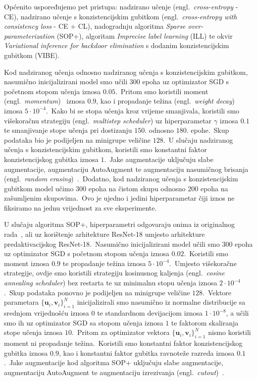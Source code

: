\documentclass[diplomskirad]{fer}
\begin{document}
Općenito uspoređujemo pet pristupa: nadzirano učenje (engl.\ \textit{cross-entropy} - CE), nadzirano učenje s konzistencijskim gubitkom (engl.\ \textit{cross-entropy with consistency loss} - CE + CL), nadogradnju algoritma \textit{Sparse over-parameterization} (SOP+), algoritam \textit{Imprecise label learning} (ILL) te okvir \textit{Variational inference for backdoor elimination} s dodanim konzistencijskim gubitkom (VIBE).\ 

Kod nadziranog učenja odnosno nadziranog učenja s konzistencijskim gubitkom, nasumično inicijalizirani model smo učili $300$ epoha uz optimizator SGD s početnom stopom učenja iznosa $0.05$.\ 
Pritom smo koristili moment (engl.\ \textit{momentum})~\cite{sutskever2013importance} iznosa $0.9$, kao i propadanje težina (engl.\ \textit{weight decay})~\cite{krogh1991simple} iznosa $5 \cdot 10^{-4}$.\ 
Kako bi se stopa učenja kroz vrijeme smanjivala, koristili smo višekoračnu strategiju (engl.\ \textit{multistep scheduler}) uz hiperparametar $\gamma$ iznosa $0.1$ te smanjivanje stope učenja pri dostizanju $150.$ odnosno $180.$ epohe.\ 
Skup podataka bio je podijeljen na minigrupe veličine $128$.\ U slučaju nadziranog učenja s konzistencijskim gubitkom, koristili smo konstantni faktor konzistencijskog gubitka iznosa $1$.\ 
Jake augmentacije uključuju slabe augmentacije, augmentaciju AutoAugment te augmentaciju nasumičnog brisanja (engl.\ \textit{random erasing})~\cite{zhong2020random}.\ 
Dodatno, kod nadziranog učenja s konzistencijskim gubitkom model učimo $300$ epoha na čistom skupu odnosno $200$ epoha na zašumljenim skupovima.\ Ovo je ujedno i jedini hiperparametar čiji iznos ne fiksiramo na jednu vrijednost za sve eksperimente.\ 

U slučaju algoritma SOP+, hiperparametri odgovaraju onima iz originalnog rada~\cite{liu2022robust}, ali uz korištenje arhitekture ResNet-18 umjesto arhitekture predaktivacijskog ResNet-18.\ Nasumično inicijalizirani model učili smo $300$ epoha uz optimizator SGD s početnom stopom učenja iznosa $0.02$.\ 
Koristili smo moment iznosa $0.9$ te propadanje težina iznosa $5 \cdot 10^{-4}$.\ Umjesto višekoračne strategije, ovdje smo koristili strategiju kosinusnog kaljenja (engl.\ \textit{cosine annealing scheduler}) bez restarta te uz minimalnu stopu učenja iznosa $2 \cdot 10^{-4}$.\ Skup podataka ponovno je podijeljen na minigrupe veličine $128$.\ 
Vektore parametara $\{\bm{u}_i, \bm{v}_i\}_{i=1}^N$ inicijalizirali smo nasumično iz normalne distribucije sa srednjom vrijednošću iznosa $0$ te standardnom devijacijom iznosa $1 \cdot 10^{-8}$, a učili smo ih uz optimizator SGD sa stopom učenja iznosa $1$ te faktorom skaliranja stope učenja iznosa $10$.\ 
Pritom za optimizator vektora $\{\bm{u}_i, \bm{v}_i\}_{i=1}^N$ nismo koristili moment ni propadanje težina.\
Koristili smo konstantni faktor konzistencijskog gubitka iznosa $0.9$, kao i konstantni faktor gubitka ravnoteže razreda iznosa $0.1$.\ 
Jake augmentacije kod algoritma SOP+ uključuju slabe augmentacije, augmentaciju AutoAugment te augmentaciju izrezivanja (engl.\ \textit{cutout})~\cite{devries2017improved}.\ 
\end{document}
